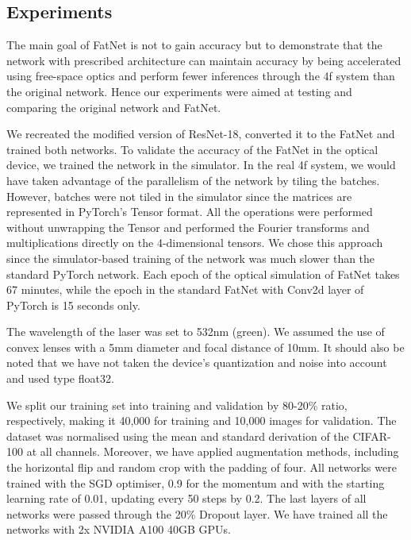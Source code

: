 \documentclass{article}
\begin{document}
\subsection{Experiments}

The main goal of FatNet is not to gain accuracy but to demonstrate that the network with prescribed architecture can maintain accuracy by being accelerated using free-space optics and perform fewer inferences through the 4f system than the original network. Hence our experiments were aimed at testing and comparing the original network and FatNet. 

We recreated the modified version of ResNet-18, converted it to the FatNet and trained both networks. To validate the accuracy of the FatNet in the optical device, we trained the network in the simulator. In the real 4f system, we would have taken advantage of the parallelism of the network by tiling the batches. However, batches were not tiled in the simulator since the matrices are represented in PyTorch's Tensor format. All the operations were performed without unwrapping the Tensor and performed the Fourier transforms and multiplications directly on the 4-dimensional tensors. We chose this approach since the simulator-based training of the network was much slower than the standard PyTorch network. Each epoch of the optical simulation of FatNet takes 67 minutes, while the epoch in the standard FatNet with Conv2d layer of PyTorch is 15 seconds only. 

The wavelength of the laser was set to 532nm (green). We assumed the use of convex lenses with a 5mm diameter and focal distance of 10mm. It should also be noted that we have not taken the device's quantization and noise into account and used type float32. 

We split our training set into training and validation by 80-20\% ratio, respectively, making it 40,000 for training and 10,000 images for validation.
The dataset was normalised using the mean and standard derivation of the CIFAR-100 at all channels. Moreover, we have applied augmentation methods, including the horizontal flip and random crop with the padding of four. All networks were trained with the SGD optimiser, 0.9 for the momentum and with the starting learning rate of 0.01, updating every 50 steps by 0.2. The last layers of all networks were passed through the 20\% Dropout layer. We have trained all the networks with 2x NVIDIA A100 40GB GPUs.
\end{document}
